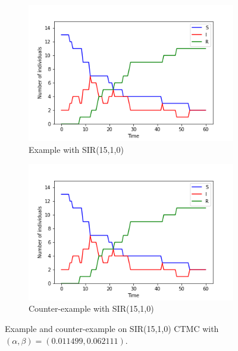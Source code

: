 \begin{figure}[H]
    \centering
    \begin{subfigure}{0.48\textwidth}
        \centering
        \includegraphics[width=\linewidth]{figures/sir_1510_trace_1.png}
        \caption{Example with SIR(15,1,0)}
    \end{subfigure}
    \hfill
    \begin{subfigure}{0.48\textwidth}
        \centering
        \includegraphics[width=\linewidth]{figures/sir_1510_trace_1.png}
        \caption{Counter-example with SIR(15,1,0)}
    \end{subfigure}
    \caption{Example and counter-example on SIR(15,1,0) CTMC with $(\alpha, \beta)=(0.011499, 0.062111)$.}
\end{figure}

\newpage
